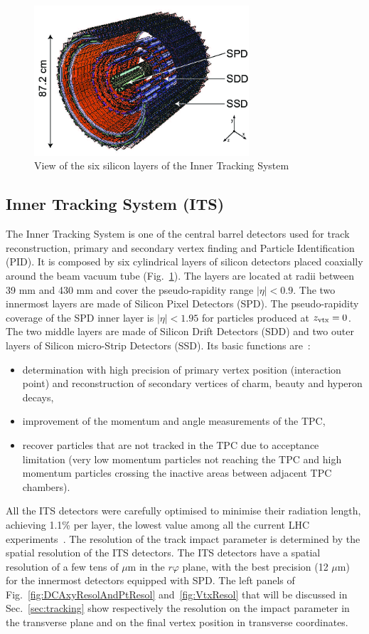 \begin{figure}[!t]
\centering
\includegraphics[width=8cm]{FigCap3/figures_its-rf-2.png}
\caption{View of the six silicon layers of the Inner Tracking System}
\label{fig:image2}
\end{figure}

\subsection{Inner Tracking System (ITS)}
\label{sec:ITS}
The Inner Tracking System is one of the central barrel detectors used for track 
reconstruction, primary and secondary vertex finding and Particle Identification (PID).
It is composed by six cylindrical layers of silicon detectors placed 
coaxially around the beam vacuum tube (Fig.~\ref{fig:image2}). The layers are located 
at radii between 39 mm and 430 mm and cover the pseudo-rapidity range 
$|\eta|<0.9$. The two innermost layers are made of Silicon Pixel Detectors (SPD). 
The pseudo-rapidity coverage of the SPD inner layer is $|\eta|<1.95$ for particles produced at $z_{\rm vtx}=0$. 
The two middle layers are made of Silicon Drift Detectors (SDD) 
and two outer layers of Silicon micro-Strip Detectors (SSD).
Its basic functions are~\cite{ITS-TDR}:
\begin{itemize}
\item determination with high precision of primary vertex position (interaction point) and reconstruction of secondary vertices 
of charm, beauty and hyperon decays,
\item improvement of the momentum and angle measurements of the TPC,
\item recover particles that are not tracked in the TPC due to acceptance limitation (very low momentum particles
not reaching the TPC and high momentum particles crossing the inactive areas between adjacent TPC chambers).
\end{itemize}
All the ITS detectors were carefully optimised to minimise their radiation 
 length, achieving 1.1\% per layer, the lowest value among all the current LHC experiments~\cite{ITS-TDR}. 
The resolution of the track impact parameter is determined by the spatial resolution of 
the ITS detectors. The ITS detectors have a spatial resolution of a few tens of 
$\mu$m in the $r\varphi$ plane, with the best precision (12  $\mu$m) for the 
innermost detectors equipped with SPD. The left panels of Fig.~\ref{fig:DCAxyResolAndPtResol} and~\ref{fig:VtxResol} that will be discussed
 in Sec.~\ref{sec:tracking} show respectively the resolution on the impact parameter
in the transverse plane and on the final vertex position in transverse coordinates. \\
 
